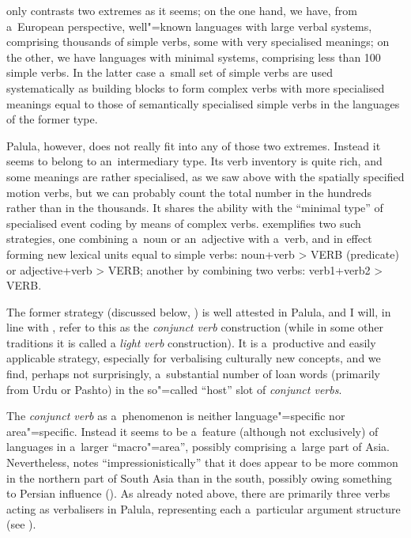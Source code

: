 \citet[409]{viberg2006} only contrasts two extremes as it seems; on the one hand, we have, from a~European perspective, well"=known languages with large verbal systems, comprising thousands of simple verbs, some with very specialised meanings; on the other, we have languages with minimal systems, comprising less than 100 simple verbs. In the latter case a~small set of simple verbs are used systematically as building blocks to form complex verbs with more specialised meanings equal to those of semantically specialised simple verbs in the languages of the former type. 



Palula, however, does not really fit into any of those two extremes. Instead it seems to belong to an~intermediary type. Its verb inventory is quite rich, and some meanings are rather specialised, as we saw above with the spatially specified motion verbs, but we can probably count the total number in the hundreds rather than in the thousands. It shares the ability with the ``minimal type'' of specialised event coding by means of complex verbs. \citet[348]{viberg2006} exemplifies two such strategies, one combining a~noun or an~adjective with a~verb, and in effect forming new lexical units equal to simple verbs: noun+verb {\textgreater} VERB (predicate) or adjective+verb {\textgreater} VERB; another by combining two verbs: verb1+verb2 {\textgreater} VERB. 



The former strategy (discussed below, ) is well attested in Palula, and I will, in line with \citet[326]{masica1991}, refer to this as the \textit{conjunct verb} construction (while in some other traditions it is called a \textit{light} \textit{verb} construction). It is a~productive and easily applicable strategy, especially for verbalising culturally new concepts, and we find, perhaps not surprisingly, a~substantial number of loan words (primarily from Urdu or Pashto) in the so"=called ``host'' slot of \textit{conjunct verbs}. 



The \textit{conjunct verb} as a~phenomenon is neither language"=specific nor area"=specific. Instead it seems to be a~feature (although not exclusively) of languages in a~larger ``macro"=area'', possibly comprising a~large part of Asia. Nevertheless, \citeauthor{masica1991} notes ``impressionistically'' that it does appear to be more common in the northern part of South Asia than in the south, possibly owing something to Persian influence (\citeyear[368]{masica1991}). As already noted above, there are primarily three verbs acting as verbalisers in Palula, representing each a~particular argument structure (see ). 




